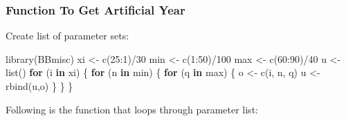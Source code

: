 \documentclass[
]{article}
\newenvironment{Shaded}{\begin{snugshade}}{\end{snugshade}}
\newcommand{\ControlFlowTok}[1]{\textcolor[rgb]{0.13,0.29,0.53}{\textbf{#1}}}
\newcommand{\DecValTok}[1]{\textcolor[rgb]{0.00,0.00,0.81}{#1}}
\newcommand{\FunctionTok}[1]{\textcolor[rgb]{0.00,0.00,0.00}{#1}}
\newcommand{\NormalTok}[1]{#1}
\newcommand{\OtherTok}[1]{\textcolor[rgb]{0.56,0.35,0.01}{#1}}
\newcommand{\SpecialCharTok}[1]{\textcolor[rgb]{0.00,0.00,0.00}{#1}}
\begin{document}
\hypertarget{function-to-get-artificial-year}{%
\subsubsection{Function To Get Artificial
Year}\label{function-to-get-artificial-year}}

Create list of parameter sets:

\begin{Shaded}
\begin{Highlighting}[]
\FunctionTok{library}\NormalTok{(BBmisc)}
\NormalTok{xi }\OtherTok{\textless{}{-}} \FunctionTok{c}\NormalTok{(}\DecValTok{25}\SpecialCharTok{:}\DecValTok{1}\NormalTok{)}\SpecialCharTok{/}\DecValTok{30}
\NormalTok{min }\OtherTok{\textless{}{-}} \FunctionTok{c}\NormalTok{(}\DecValTok{1}\SpecialCharTok{:}\DecValTok{50}\NormalTok{)}\SpecialCharTok{/}\DecValTok{100}
\NormalTok{max }\OtherTok{\textless{}{-}} \FunctionTok{c}\NormalTok{(}\DecValTok{60}\SpecialCharTok{:}\DecValTok{90}\NormalTok{)}\SpecialCharTok{/}\DecValTok{40}
\NormalTok{u }\OtherTok{\textless{}{-}} \FunctionTok{list}\NormalTok{()}
  \ControlFlowTok{for}\NormalTok{ (i }\ControlFlowTok{in}\NormalTok{ xi) \{}
    \ControlFlowTok{for}\NormalTok{ (n }\ControlFlowTok{in}\NormalTok{ min) \{}
      \ControlFlowTok{for}\NormalTok{ (q }\ControlFlowTok{in}\NormalTok{ max) \{}
\NormalTok{        o }\OtherTok{\textless{}{-}} \FunctionTok{c}\NormalTok{(i, n, q)}
\NormalTok{        u }\OtherTok{\textless{}{-}} \FunctionTok{rbind}\NormalTok{(u,o)}
\NormalTok{      \}}
\NormalTok{    \}}
\NormalTok{  \}}
\end{Highlighting}
\end{Shaded}

Following is the function that loops through parameter list:
\end{document}
